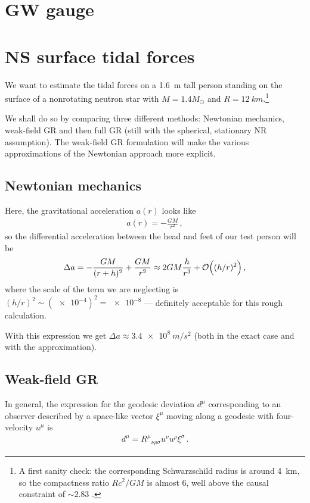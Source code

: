 \documentclass[main.tex]{subfiles}
\begin{document}
\section{GW gauge}

\section{NS surface tidal forces}

We want to estimate the tidal forces on a \SI{1.6}{m} tall person standing on the surface of a nonrotating neutron star with \(M = 1.4 M_{\odot}\) and \(R = \SI{12}{km}\).\footnote{A first sanity check: the corresponding Schwarzschild radius is around \SI{4}{km}, so the compactness ratio \(R c^2 / G M\) is almost 6, well above the causal constraint of \(\sim 2.83\) \cite[eq.\ 5, fig.\ 2]{lattimerNeutronStarObservations2007a}.}

We shall do so by comparing three different methods: Newtonian mechanics, weak-field GR and then full GR (still with the spherical, stationary NR assumption).
The weak-field GR formulation will make the various approximations of the Newtonian approach more explicit. 

\subsection{Newtonian mechanics}

Here, the gravitational acceleration \(a (r)\) looks like 
%
\begin{align}
a (r) = - \frac{GM}{r^2}
\,,
\end{align}
%
so the differential acceleration between the head and feet of our test person will be 
%
\begin{align}
\Delta a = - \frac{GM}{(r + h)^2} + \frac{GM}{r^2} \approx 2GM \frac{h}{r^3} + \order{ (h / r)^2}
\,,
\end{align}
%
where the scale of the term we are neglecting is \((h / r)^2 \sim (\num{e-4})^2 = \num{e-8}\) --- definitely acceptable for this rough calculation.

With this expression we get \(\Delta a \approx \SI{3.4e8}{m/s^2}\) (both in the exact case and with the approximation). 

\subsection{Weak-field GR}

In general, the expression for the geodesic deviation \(d^{\mu }\) corresponding to an observer described by a space-like vector \(\xi^{\mu }\) moving along a geodesic with four-velocity \(u^{\mu }\)  is \cite[eq.\ 3.208]{carrollSpacetimeGeometryIntroduction2019}
%
\begin{align}
d^{\mu } = R^{\mu }{}_{\nu \rho \sigma  } u^{\nu } u^{\rho } \xi^{\sigma }
\,.
\end{align}
\end{document}
